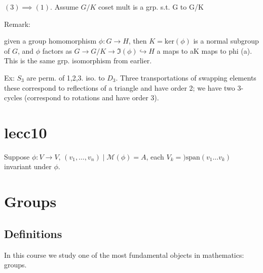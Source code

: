 \documentclass[12pt,oneside]{report}
\begin{document}
\( (3) \implies (1) \). Assume \( G / K \) coset mult is a grp.  s.t. G to G/K 



Remark:

given a group homomorphism \( \phi  : G\to  H \), then \( K=\text{ker}(\phi ) \) is a normal subgroup of \( G \), and \(  \phi  \) factors as \( G \to  G / K \to  \Im(\phi ) \hookrightarrow H \)  a maps to aK maps to phi (a). This is the same grp. isomorphism from earlier. 


Ex: \( S_{3} \) are perm. of 1,2,3. iso. to \( D_{3} \). Three transportations of swapping elements these correspond to reflections of a triangle and have order 2; we have two 3-cycles (correspond to rotations and have order 3). 








\section{lecc10}




Suppose \( \phi  : V \to  V, \, (v_{1},\ldots ,v_n) \mid  \mathscr{M} (\phi )=A \), each \( V_k=)\text{span}(v_{1}\ldots v_k) \) invariant under \( \phi  \).



\section{Groups}

\subsection{Definitions}

In this course we study one of the most fundamental objects in mathematics: groups. 
\end{document}
